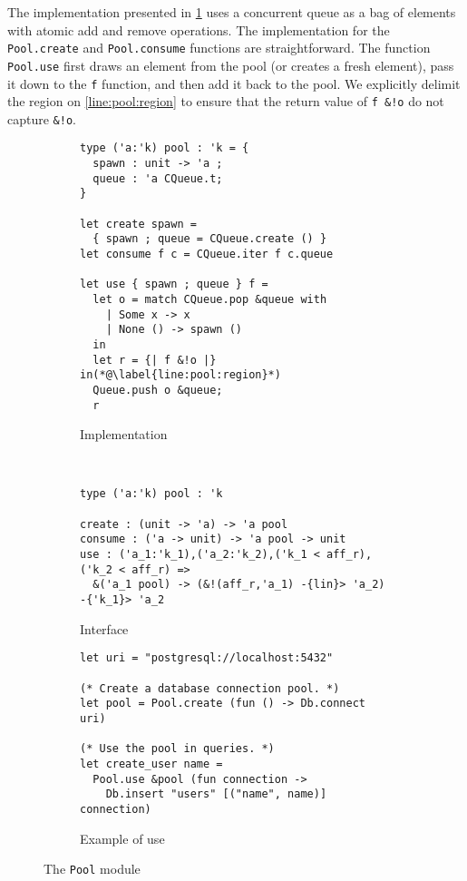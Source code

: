 The implementation presented in \cref{impl:pool} uses a concurrent queue
as a bag of elements with atomic add and remove operations.
The implementation for the \lstinline/Pool.create/ and \lstinline/Pool.consume/
functions are straightforward.
The function \lstinline/Pool.use/ first draws
an element from the pool (or creates a fresh element),
pass it down to the \lstinline/f/ function, and then add
it back to the pool.
We explicitly delimit the region on \cref{line:pool:region} to ensure that
the return value of \lstinline/f &!o/ do not capture \lstinline/&!o/.

\begin{figure}[!h]
  \centering
  \begin{subfigure}[t]{.45\linewidth}
\begin{lstlisting}
type ('a:'k) pool : 'k = {
  spawn : unit -> 'a ;
  queue : 'a CQueue.t;
}

let create spawn =
  { spawn ; queue = CQueue.create () }
let consume f c = CQueue.iter f c.queue

let use { spawn ; queue } f =
  let o = match CQueue.pop &queue with
    | Some x -> x
    | None () -> spawn ()
  in
  let r = {| f &!o |} in(*@\label{line:pool:region}*)
  Queue.push o &queue;
  r
\end{lstlisting}
    \caption{Implementation}
    \label{impl:pool}
  \end{subfigure}~
  \begin{subfigure}[t]{.55\linewidth}
\begin{lstlisting}
type ('a:'k) pool : 'k

create : (unit -> 'a) -> 'a pool
consume : ('a -> unit) -> 'a pool -> unit
use : ('a_1:'k_1),('a_2:'k_2),('k_1 < aff_r),('k_2 < aff_r) =>
  &('a_1 pool) -> (&!(aff_r,'a_1) -{lin}> 'a_2) -{'k_1}> 'a_2
\end{lstlisting}
    \caption{Interface}
    \label{intf:pool}

\begin{lstlisting}
let uri = "postgresql://localhost:5432"

(* Create a database connection pool. *)
let pool = Pool.create (fun () -> Db.connect uri)

(* Use the pool in queries. *)
let create_user name =
  Pool.use &pool (fun connection ->
    Db.insert "users" [("name", name)] connection)
\end{lstlisting}
    \caption{Example of use}
    \label{ex:pool}
  \end{subfigure}

  \caption{The \texttt{Pool} module}
  \label{fig:pool}
\end{figure}


